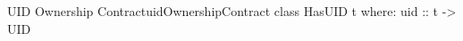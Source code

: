 \begin{pseudohaskell}{UID Ownership Contract}{uidOwnershipContract}
class HasUID t where:
      uid :: t -> UID
\end{pseudohaskell}
